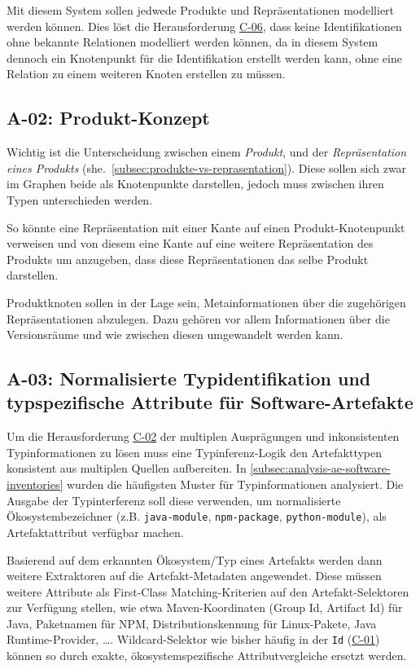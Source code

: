 Mit diesem System sollen jedwede Produkte und Repräsentationen modelliert werden können.
Dies löst die Herausforderung \hyperref[subsec:c-06-falle-ohne-aktion-konnen-nicht-dokumentiert-werden]{C-06}, dass keine Identifikationen ohne bekannte Relationen modelliert werden können, da in diesem System dennoch ein Knotenpunkt für die Identifikation erstellt werden kann, ohne eine Relation zu einem weiteren Knoten erstellen zu müssen.

\subsection{A-02: Produkt-Konzept}\label{subsec:req-product-concept}

Wichtig ist die Unterscheidung zwischen einem \textit{Produkt}, und der \textit{Repräsentation eines Produkts} (she.\ \autoref{subsec:produkte-vs-reprasentation}).
Diese sollen sich zwar im Graphen beide als Knotenpunkte darstellen, jedoch muss zwischen ihren Typen unterschieden werden.

So könnte eine Repräsentation mit einer Kante auf einen Produkt-Knotenpunkt verweisen und von diesem eine Kante auf eine weitere Repräsentation des Produkts um anzugeben, dass diese Repräsentationen das selbe Produkt darstellen.

Produktknoten sollen in der Lage sein, Metainformationen über die zugehörigen Repräsentationen abzulegen.
Dazu gehören vor allem Informationen über die Versionsräume und wie zwischen diesen umgewandelt werden kann.

\subsection{A-03: Normalisierte Typidentifikation und typspezifische Attribute für Software-Artefakte}\label{subsec:req-type-specific-matching}

Um die Herausforderung \hyperref[subsec:c-02-uneindeutige-artefakt-typinformation]{C-02} der multiplen Ausprägungen und inkonsistenten Typinformationen zu lösen muss eine Typinferenz-Logik den Artefakttypen konsistent aus multiplen Quellen aufbereiten.
In \autoref{subsec:analysis-ae-software-inventories} wurden die häufigsten Muster für Typinformationen analysiert.
Die Ausgabe der Typinterferenz soll diese verwenden, um normalisierte Ökosystembezeichner (z.B. \texttt{java-module}, \texttt{npm-package}, \texttt{python-module}), als Artefaktattribut verfügbar machen.

Basierend auf dem erkannten Ökosystem/Typ eines Artefakts werden dann weitere Extraktoren auf die Artefakt-Metadaten angewendet.
Diese müssen weitere Attribute als First-Class Matching-Kriterien auf den Artefakt-Selektoren zur Verfügung stellen, wie etwa Maven-Koordinaten (Group Id, Artifact Id) für Java, Paketnamen für NPM, Distributionskennung für Linux-Pakete, Java Runtime-Provider, \ldots.
Wildcard-Selektor wie bisher häufig in der \texttt{Id} (\hyperref[subsec:c-01-unspezifische-identifikation-von-artefakten]{C-01}) können so durch exakte, ökosystemspezifische Attributvergleiche ersetzt werden.


